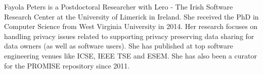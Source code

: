 \documentclass[conference]{IEEEtran}
\begin{document}
Fayola Peters is a Postdoctoral Researcher with Lero - The Irish Software Research Center at the University of Limerick in Ireland. She received the PhD in Computer Science from West Virginia University in 2014. Her research focuses on handling privacy issues related to supporting privacy preserving data sharing for data owners 
(as well as software users). She has published at top software engineering venues like ICSE, IEEE TSE and ESEM. She has also been a curator for the PROMISE repository since 2011.


 \balance




%




\end{document}

